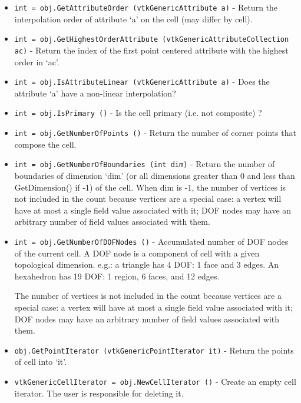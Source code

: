 \begin{itemize}
\item  \verb|int = obj.GetAttributeOrder (vtkGenericAttribute a)| -  Return the interpolation order of attribute `a' on the cell
 (may differ by cell).  
 
 

\item  \verb|int = obj.GetHighestOrderAttribute (vtkGenericAttributeCollection ac)| -  Return the index of the first point centered attribute with the highest
 order in `ac'.
 
 

\item  \verb|int = obj.IsAttributeLinear (vtkGenericAttribute a)| -  Does the attribute `a' have a non-linear interpolation?
 
 

\item  \verb|int = obj.IsPrimary ()| -  Is the cell primary (i.e. not composite) ?

\item  \verb|int = obj.GetNumberOfPoints ()| -  Return the number of corner points that compose the cell.
 

\item  \verb|int = obj.GetNumberOfBoundaries (int dim)| -  Return the number of boundaries of dimension `dim' (or all dimensions
 greater than 0 and less than GetDimension() if -1) of the cell.
 When  dim is -1, the number of vertices is not included in the
 count because vertices are a special case: a vertex will have
 at most a single field value associated with it; DOF nodes may have
 an arbitrary number of field values associated with them.
 
 

\item  \verb|int = obj.GetNumberOfDOFNodes ()| -  Accumulated number of DOF nodes of the current cell. A DOF node is
 a component of cell with a given topological dimension. e.g.: a triangle
 has 4 DOF: 1 face and 3 edges. An hexahedron has 19 DOF:
 1 region, 6 faces, and 12 edges.

 The number of vertices is not included in the
 count because vertices are a special case: a vertex will have
 at most a single field value associated with it; DOF nodes may have
 an arbitrary number of field values associated with them.
 

\item  \verb|obj.GetPointIterator (vtkGenericPointIterator it)| -  Return the points of cell into `it'.
 

\item  \verb|vtkGenericCellIterator = obj.NewCellIterator ()| -  Create an empty cell iterator. The user is responsible for deleting it.
 


\end{itemize}
